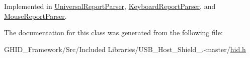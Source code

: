 \-Implemented in \hyperlink{class_universal_report_parser_a7b88d36949e3823cd80b3c7cece3d67e}{\-Universal\-Report\-Parser}, \hyperlink{class_keyboard_report_parser_a60d8d4d4d187ce5c0e0d69aee7cc772f}{\-Keyboard\-Report\-Parser}, and \hyperlink{class_mouse_report_parser_a2dd4e0add7c902300de5e7250c6d6110}{\-Mouse\-Report\-Parser}.



\-The documentation for this class was generated from the following file\-:\begin{DoxyCompactItemize}
\item 
\-G\-H\-I\-D\-\_\-\-Framework/\-Src/\-Included Libraries/\-U\-S\-B\-\_\-\-Host\-\_\-\-Shield\-\_.-\/master/\hyperlink{hid_8h}{hid.\-h}\end{DoxyCompactItemize}
